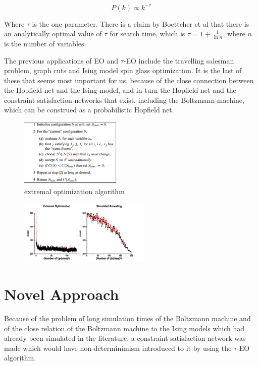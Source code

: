 \documentclass[12pt]{article}
\begin{document}
$$P(k) \propto k^{-\tau}$$

Where $\tau$ is the one parameter. There is a claim by Boettcher et al that there is an analytically optimal value of $\tau$ for search time, which is $\tau = 1 + \frac{1}{\ln n}$, where $n$ is the number of variables.%


The previous applications of EO and $\tau$-EO include the travelling salesman problem, graph cuts and Ising model spin glass optimization. It is the last of these that seems most important for us, because of the close connection between the Hopfield net and the Ising model, and in turn the Hopfield net and the constraint satisfaction networks that exist, including the Boltzmann machine, which can be construed as a probabilistic Hopfield net.

\begin{figure}
  \includegraphics{eo_alg} %
  \caption{extremal optimization algorithm}
\end{figure}
  \begin{figure}
    \includegraphics{boettcher}
  \end{figure}
  
\section{Novel Approach}
Because of the problem of long simulation times of the Boltzmann machine and of the close relation of the Boltzmann machine to the Ising models which had already been simulated in the literature, a constraint satisfaction network was made which would have non-determinimism introduced to it by using the $\tau$-EO algorithm.
\end{document}
